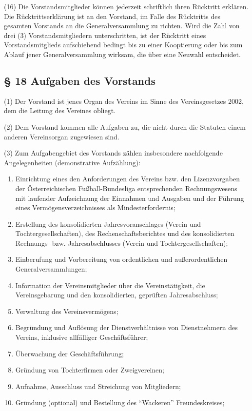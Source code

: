 \documentclass[11pt,a4paper]{article}
\begin{document}
(16)
Die Vorstandsmitglieder können jederzeit schriftlich ihren Rücktritt erklären.
Die Rücktrittserklärung ist an den Vorstand, im Falle des Rücktritts des gesamten Vorstands an die Generalversammlung zu richten.
Wird die Zahl von drei (3) Vorstandsmitgliedern unterschritten, ist der Rücktritt eines Vorstandsmitglieds aufschiebend bedingt bis zu einer Kooptierung oder bis zum Ablauf jener Generalversammlung wirksam, die über eine Neuwahl entscheidet.

\subsection{§ 18
Aufgaben des Vorstands}

(1)
Der Vorstand ist jenes Organ des Vereins im Sinne des Vereinsgesetzes 2002, dem die Leitung des Vereines obliegt.

(2)
Dem Vorstand kommen alle Aufgaben zu, die nicht durch die Statuten einem anderen Vereinsorgan zugewiesen sind.

(3)
Zum Aufgabengebiet des Vorstands zählen insbesondere nachfolgende Angelegenheiten (demonstrative Aufzählung):

\begin{enumerate}[label=\alph*)]
\item
Einrichtung eines den Anforderungen des Vereins bzw. den Lizenzvorgaben der Österreichischen Fußball-Bundesliga entsprechenden Rechnungswesens mit laufender Aufzeichnung der Einnahmen und Ausgaben und der Führung eines Vermögensverzeichnisses als Mindesterfordernis;
\item
Erstellung des konsolidierten Jahresvoranschlages (Verein und Tochtergesellschaften), des Rechenschaftsberichtes und des konsolidierten Rechnungs- bzw. Jahresabschlusses (Verein und Tochtergesellschaften);
\item
Einberufung und Vorbereitung von ordentlichen und außerordentlichen Generalversammlungen;
\item
Information der Vereinsmitglieder über die Vereinstätigkeit, die Vereinsgebarung und den konsolidierten, geprüften Jahresabschluss;
\item
Verwaltung des Vereinsvermögens;
\item
Begründung und Auflösung der Dienstverhältnisse von Dienstnehmern des Vereins, inklusive allfälliger Geschäftsführer;
\item
Überwachung der Geschäftsführung;
\item
Gründung von Tochterfirmen oder Zweigvereinen;
\item
Aufnahme, Ausschluss und Streichung von Mitgliedern;
\item
Gründung (optional) und Bestellung des "`Wackeren"' Freundeskreises;
\end{enumerate}
\end{document}
